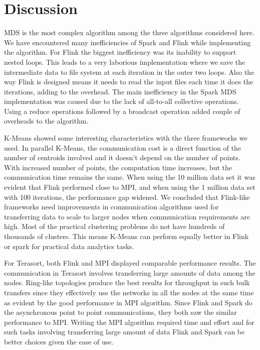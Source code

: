 \documentclass[conference]{IEEEtran}
\begin{document}
\section{Discussion} \label{discussion}

MDS is the most complex algorithm among the three algorithms considered here. We have encountered many inefficiencies of Spark and Flink while implementing the algorithm. For Flink the biggest inefficiency was its inability to support nested loops. This leads to a very laborious implementation where we save the intermediate data to file system at each iteration in the outer two loops. Also the way Flink is designed means it needs to read the input files each time it does the iterations, adding to the overhead. The main inefficiency in the Spark MDS implementation was caused due to the lack of all-to-all collective operations. Using a reduce operations followed by a broadcast operation added couple of overheads to the algorithm. 

K-Means showed some interesting characteristics with the three frameworks we used. In parallel K-Means, the communication cost is a direct function of the number of centroids involved and it doesn't depend on the number of points. With increased number of points, the computation time increases, but the communication time remains the same. When using the 10 million data set it was evident that Flink performed close to MPI, and when using the 1 million data set with 100 iterations, the performance gap widened. We concluded that Flink-like frameworks need improvements in communication algorithms used for transferring data to scale to larger nodes when communication requirements are high. Most of the practical clustering problems do not have hundreds of thousands of clusters. This means K-Means can perform equally better in Flink or spark for practical data analytics tasks.

For Terasort, both Flink and MPI displayed comparable performance results. The communication in Terasort involves transferring large amounts of data among the nodes. Ring-like topologies produce the best results for throughput in such bulk transfers since they effectively use the networks in all the nodes at the same time as evident by the good performance in MPI algorithm. Since Flink and Spark do the asynchronous point to point communications, they both saw the similar performance to MPI. Writing the MPI algorithm required time and effort and for such tasks involving transferring large amount of data Flink and Spark can be better choices given the ease of use. 
\end{document}
